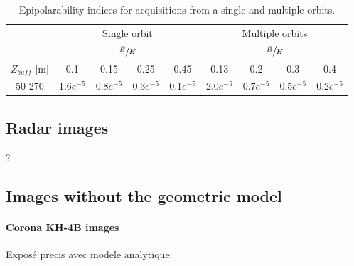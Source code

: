 \documentclass{ipol}
\begin{document}
\begin{table}[t!]

\begin{center}
\begin{tabular}{|c|c|c|c|c||c|c|c|c|}

\multicolumn{1}{c}{}  & \multicolumn{4}{c}{Single orbit} & \multicolumn{4}{c}{Multiple orbits}   \\
 \cline{2-9} 
 \multicolumn{1}{c}{}  & \multicolumn{4}{|c||}{ $\sfrac{B}{H}$ } & \multicolumn{4}{|c|}{$\sfrac{B}{H}$ }  \\
 \multicolumn{1}{c|}{$Z_{buff}$ [m]}  &  0.1 &  0.15   & 0.25  &  0.45 &  0.13 &  0.2   & 0.3  &  0.4   \\
 \cline{1-9}
  
 50-270  &   1.6$e^{-5}$    &  0.8$e^{-5}$  &  0.3$e^{-5}$  &  0.1$e^{-5}$   &   2.0$e^{-5}$  &     0.7$e^{-5}$  &  0.5$e^{-5}$   &    0.2$e^{-5}$   \\
\hline 

\end{tabular}
\end{center}
\caption{Epipolarability indices for acquisitions from a single and {multiple orbits}.}\label{tab:PHR1indices}
\end{table}

\subsection{Radar images}

? 


\subsection{Images without the geometric model}

\paragraph{Corona KH-4B images}
Exposé precis avec modele analytique:
\end{document}
